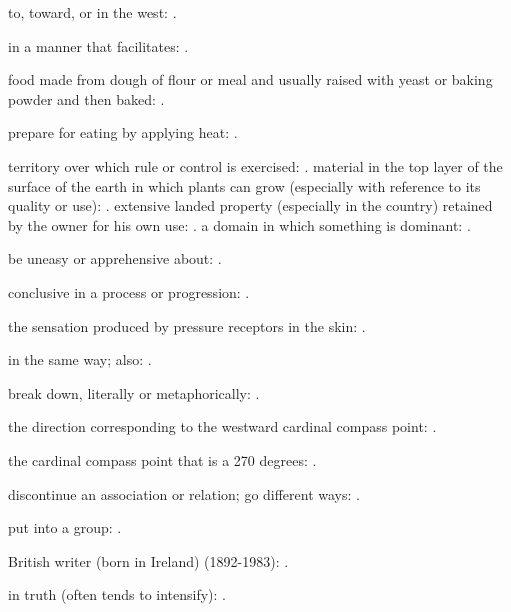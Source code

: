   to, toward, or in the west: .

  in a manner that facilitates: .

  food made from dough of flour or meal and usually raised with yeast or baking powder and then baked:   .

  prepare for eating by applying heat:   .

  territory over which rule or control is exercised:   . material in the top layer of the surface of the earth in which plants can grow (especially with reference to its quality or use):   . extensive landed property (especially in the country) retained by the owner for his own use:   . a domain in which something is dominant:   .

  be uneasy or apprehensive about: .

  conclusive in a process or progression:   .

  the sensation produced by pressure receptors in the skin: .

  in the same way; also: .

  break down, literally or metaphorically:   .

  the direction corresponding to the westward cardinal compass point: .

  the cardinal compass point that is a 270 degrees:   .

  discontinue an association or relation; go different ways:   .

  put into a group:   .

  British writer (born in Ireland) (1892-1983):   .

  in truth (often tends to intensify):   .

